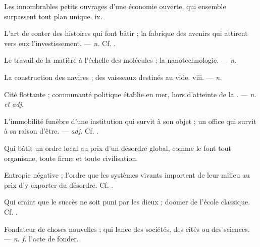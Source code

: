  Les innombrables petits ouvrages d'une économie ouverte, qui ensemble surpassent tout plan unique.   ix.

 L'art de conter des histoires qui font bâtir ; la fabrique des avenirs qui attirent vers eux l'investissement. ---  \textit{n.} Cf. .

 Le travail de la matière à l'échelle des molécules ; la nanotechnologie. ---  \textit{n.}

 La construction des navires ;  des vaisseaux destinés au vide.   viii. ---  \textit{n.}

 Cité flottante ; communauté politique établie en mer, hors d'atteinte de la . ---  \textit{n. et adj.}

 L'immobilité funèbre d'une institution qui survit à son objet ; un office qui survit à sa raison d'être. ---  \textit{adj.} Cf. .

 Qui bâtit un ordre local au prix d'un désordre global, comme le font tout organisme, toute firme et toute civilisation.

 Entropie négative ; l'ordre que les systèmes vivants importent de leur milieu au prix d'y exporter du désordre. Cf. .

 Qui craint que le succès ne soit puni par les dieux ; doomer de l'école classique. Cf. .

 Fondateur de choses nouvelles ; qui lance des sociétés, des cités ou des sciences.  ---  \textit{n. f.} l'acte de fonder.

